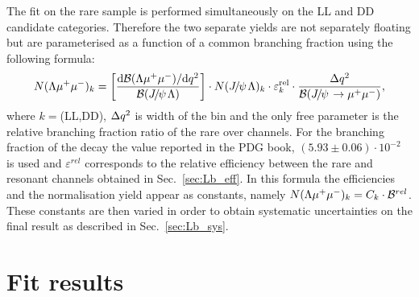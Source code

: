 The fit on the rare sample is performed simultaneously on the LL and DD candidate categories.
Therefore the two separate yields are not separately floating but are parameterised
as a function of a common branching fraction using the following formula:
%
\begin{equation}
N(\Lz\mumu)_{k}  = \left[ \frac{\mathrm{d}\mathcal{B}(\Lz\mumu)/\mathrm{d}\qsq}{\mathcal{B}(\jpsi\Lz)} \right]  \cdot
N(\jpsi\Lz)_{k} \cdot \varepsilon^{\mathrm{rel}}_{k} \cdot \frac {\Delta\qsq} { \mathcal{B}(\jpsi\to\mumu) },
\label{eq:relYield}
\end{equation}
%
where $k = $(LL,DD), $\Delta q^2$ is width of the \qsq bin and the only free parameter is the relative branching 
fraction ratio of the rare over \jpsi channels. For the branching fraction of the \jpsi\to\mumu decay the value 
reported in the PDG book, $(5.93 \pm 0.06)\cdot 10^{-2}$~\cite{PDG2014} is used and $\varepsilon^{rel}$ corresponds to
the relative efficiency between the rare and resonant channels obtained in Sec.~\ref{sec:Lb_eff}. 
In this formula the efficiencies and the normalisation yield appear as constants, namely 
$N(\Lambda\mu^+\mu^-)_{k} = C_k \cdot \mathcal{B}^{rel}$. These constants are then varied in order to obtain 
systematic uncertainties on the final result as described in Sec.~\ref{sec:Lb_sys}.


\section{Fit results}



